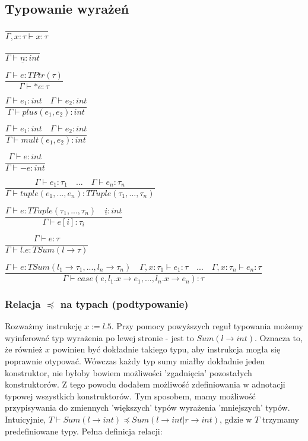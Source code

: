 \documentclass{article}
\begin{document}
\subsection{Typowanie wyrażeń}
       
\centerline{$\dfrac{}{\Gamma, x : \tau \vdash x : \tau}$}\vspace{5pt}
\centerline{$\dfrac{}{\Gamma\vdash \underline{n} : int}$}\vspace{5pt}
\centerline{$\dfrac{\Gamma\vdash e:TPtr(\tau)}{\Gamma\vdash *e : \tau}$ }\vspace{5pt}
\centerline{$\dfrac{\Gamma\vdash e_1 : int \quad \Gamma\vdash e_2 : int}{\Gamma\vdash plus(e_1,e_2) : int}$ }\vspace{5pt}
\centerline{$\dfrac{\Gamma\vdash e_1 : int \quad \Gamma\vdash e_2 : int}{\Gamma\vdash mult(e_1,e_2) : int}$ }\vspace{5pt}
\centerline{$\dfrac{\Gamma\vdash e:int}{\Gamma\vdash -e : int}$ }\vspace{5pt}
\centerline{$\dfrac{\Gamma\vdash e_1 : \tau_1 \quad ... \quad \Gamma\vdash e_n : \tau_n}{\Gamma\vdash tuple(e_1, ..., e_n) : TTuple(\tau_1, ..., \tau_n)}$
}\vspace{5pt}
\centerline{$\dfrac{\Gamma\vdash e: TTuple(\tau_1, ..., \tau_n) \quad \underline{i} : int}{\Gamma\vdash e[i] : \tau_i}$ }\vspace{5pt}
\centerline{$\dfrac{\Gamma\vdash e:\tau}{\Gamma\vdash l.e : TSum(l \rightarrow \tau)}$ }\vspace{5pt}
\centerline{$\dfrac{\Gamma\vdash e : TSum(l_1 \rightarrow \tau_1, ...,
l_n \rightarrow \tau_n) \quad \Gamma, x : \tau_1 \vdash e_1 : \tau \quad ... \quad \Gamma, x : \tau_n \vdash e_n : \tau }{\Gamma\vdash case(e, l_1.x \rightarrow e_1, ..., l_n.x \rightarrow e_n) : \tau }$}\vspace{5pt}

\subsubsection{Relacja $\preceq$ na typach (podtypowanie)}
Rozważmy instrukcję $x := l.5$. Przy pomocy powyższych reguł typowania możemy wyinferować typ wyrażenia po lewej stronie - jest to $Sum(l \rightarrow int)$. Oznacza to, że również $x$ powinien być dokładnie takiego typu, aby instrukcja mogła się poprawnie otypować. Wówczas każdy typ sumy miałby dokładnie jeden konstruktor, nie byłoby bowiem możliwości 'zgadnięcia' pozostałych konstruktorów. Z tego powodu dodałem możliwość zdefiniowania w adnotacji typowej wszystkich konstruktorów. 
Tym sposobem, mamy możliwość przypisywania do zmiennych 'większych' typów wyrażenia 'mniejszych' typów. Intuicyjnie, $T \vdash Sum(l \rightarrow int) \preceq Sum(l \rightarrow int | r \rightarrow int)$, gdzie w $T$ trzymamy predefiniowane typy. Pełna definicja relacji:\newline
\end{document}
